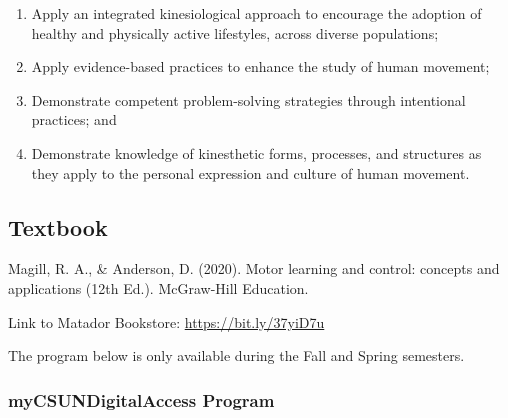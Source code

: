 \documentclass[
  letterpaper,
  DIV=11,
  numbers=noendperiod,
  oneside]{scrartcl}
\providecommand{\tightlist}{%
  \setlength{\itemsep}{0pt}\setlength{\parskip}{0pt}}\usepackage{longtable,booktabs,array}
\begin{document}
\begin{enumerate}
\def\labelenumi{\arabic{enumi}.}
\tightlist
\item
  Apply an integrated kinesiological approach to encourage the adoption
  of healthy and physically active lifestyles, across diverse
  populations;
\item
  Apply evidence-based practices to enhance the study of human movement;
\item
  Demonstrate competent problem-solving strategies through intentional
  practices; and
\item
  Demonstrate knowledge of kinesthetic forms, processes, and structures
  as they apply to the personal expression and culture of human
  movement.
\end{enumerate}

\hypertarget{textbook}{%
\subsection{Textbook}\label{textbook}}

Magill, R. A., \& Anderson, D. (2020). Motor learning and control:
concepts and applications (12th Ed.). McGraw-Hill Education.

Link to Matador Bookstore: \url{https://bit.ly/37yiD7u}

\begin{tcolorbox}[enhanced jigsaw, breakable, colbacktitle=quarto-callout-note-color!10!white, colframe=quarto-callout-note-color-frame, opacitybacktitle=0.6, title=\textcolor{quarto-callout-note-color}{\faInfo}\hspace{0.5em}{Note}, opacityback=0, colback=white, bottomrule=.15mm, toprule=.15mm, left=2mm, rightrule=.15mm, toptitle=1mm, titlerule=0mm, arc=.35mm, bottomtitle=1mm, leftrule=.75mm, coltitle=black]
The program below is only available during the Fall and Spring
semesters.
\end{tcolorbox}

\hypertarget{sec-mycsundigitalaccess}{%
\subsubsection{myCSUNDigitalAccess
Program}\label{sec-mycsundigitalaccess}}
\end{document}
